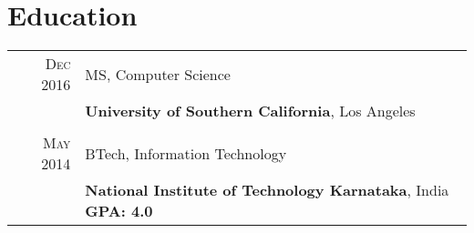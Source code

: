 \documentclass[a4paper]{article} %
\begin{document}
\section{Education}
\begin{tabular}{rl}	

\textsc{Dec 2016} & MS, Computer Science\\
&\textbf{University of Southern California}, Los Angeles\\
\\
\textsc{May} 2014 & BTech, Information Technology\\
&\textbf{National Institute of Technology Karnataka}, India\hspace{2cm} \textbf{GPA: 4.0}

\end{tabular}

\end{document}
